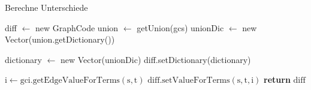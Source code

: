 \begin{algorithm}[htb]
\caption{Berechne Unterschiede}
\label{sec3:model:par:mechanism-use-cases:alg:dif}
\begin{algorithmic}[1]
    \State diff $\gets$ new GraphCode
    \State union $\gets$ getUnion(gcs)
    \State unionDic $\gets$ new Vector(union.getDictionary())
        \State {}
    \EndFor
    
    \State {}
    \State dictionary $\gets$ new Vector(unionDic)
    \State diff.setDictionary(dictionary)
    
                \State $\text{i} \gets \text{gci.getEdgeValueForTerms}(\text{s}, \text{t})$
                \State $\text{diff.setValueForTerms}(\text{s}, \text{t}, \text{i})$
            \EndFor
        \EndFor
    \EndFor
    \State \textbf{return} $\text{diff}$
\EndFunction
\end{algorithmic}
\end{algorithm}